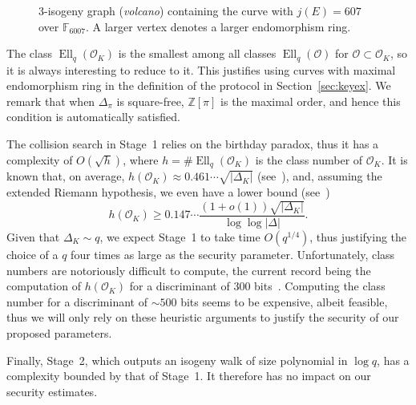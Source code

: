 \documentclass{article}
\newcommand{\F}{\mathbb{F}}
\renewcommand{\O}{\mathcal{O}}
\theoremstyle{definition}
\DeclareMathOperator{\Ell}{Ell}
\begin{document}
\begin{figure}
  \centering
  \caption{$3$-isogeny graph (\emph{volcano}) containing the curve
    with $j(E)=607$ over $\F_{6007}$. A larger vertex denotes a larger
    endomorphism ring.}
  \label{fig:volcano}
\end{figure}

The class $\Ell_q(\O_K)$ is the smallest among all classes
$\Ell_q(\O)$ for $\O⊂\O_K$, so it is always interesting to
reduce to it. This justifies using curves with maximal endomorphism
ring in the definition of the protocol in
Section~\ref{sec:keyex}. We remark that when $Δ_π$ is square-free, $ℤ[π]$
is the maximal order, and hence this condition is automatically satisfied.

The collision search in Stage~1 relies on the birthday paradox, thus
it has a complexity of $O(\sqrt{h})$, where $h=\#\Ell_q(\O_K)$ is the
class number of $\O_K$.  It is known that, on average,
$h(\O_K)≈0.461\cdots\sqrt{|Δ_K|}$ (see~\cite[5.10]{Cohen1993}), and,
assuming the extended Riemann hypothesis, we even have a lower bound
(see~\cite{littlewood1928class})
\[h(\O_K) ≥ 0.147\cdots\frac{(1+o(1))\sqrt{|Δ_K|}}{\log\log|Δ|}.\]
Given that $Δ_K\sim q$, we expect Stage~1 to take time $O(q^{1/4})$,
thus justifying the choice of a $q$ four times as large as the
security parameter.  Unfortunately, class numbers are notoriously
difficult to compute, the current record being the computation of
$h(\O_K)$ for a discriminant of 300
bits~\cite{10.1007/978-3-642-14081-5_15}. Computing the class
number for a discriminant of $\sim 500$ bits seems to be expensive,
albeit feasible, thus we will only rely on these heuristic arguments
to justify the security of our proposed parameters.

Finally, Stage~2,
which outputs an isogeny walk of size polynomial in $\log q$,
has a complexity bounded by that of Stage~1.
It therefore has no impact on our security estimates.
\end{document}
